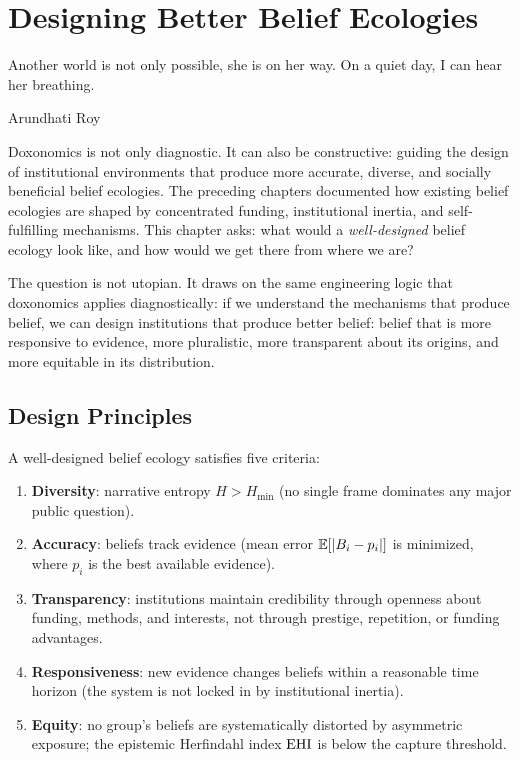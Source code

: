 \chapter{Designing Better Belief Ecologies}
\label{ch:better-belief-ecologies}

\epigraph{Another world is not only possible, she is on her way. On a quiet day, I can hear her breathing.}{Arundhati Roy}

\noindent
Doxonomics is not only diagnostic.
It can also be constructive: guiding the design of institutional environments that produce more accurate, diverse, and socially beneficial belief ecologies.
The preceding chapters documented how existing belief ecologies are shaped by concentrated funding, institutional inertia, and self-fulfilling mechanisms.
This chapter asks: what would a \emph{well-designed} belief ecology look like, and how would we get there from where we are?

The question is not utopian.
It draws on the same engineering logic that doxonomics applies diagnostically: if we understand the mechanisms that produce belief, we can design institutions that produce better belief: belief that is more responsive to evidence, more pluralistic, more transparent about its origins, and more equitable in its distribution.

\section{Design Principles}
\label{sec:ch33-principles}

\begin{principle}
\label{prin:ecology-design}
A well-designed belief ecology satisfies five criteria:
\begin{enumerate}
  \item \textbf{Diversity}: narrative entropy $H > H_{\min}$ (no single frame dominates any major public question).
  \item \textbf{Accuracy}: beliefs track evidence (mean error $\mathbb{E}[|B_{i} - p_i|]$ is minimized, where $p_i$ is the best available evidence).
  \item \textbf{Transparency}: institutions maintain credibility through openness about funding, methods, and interests, not through prestige, repetition, or funding advantages.
  \item \textbf{Responsiveness}: new evidence changes beliefs within a reasonable time horizon (the system is not locked in by institutional inertia).
  \item \textbf{Equity}: no group's beliefs are systematically distorted by asymmetric exposure; the epistemic Herfindahl index $\mathrm{EHI}$ is below the capture threshold.
\end{enumerate}
\end{principle}

